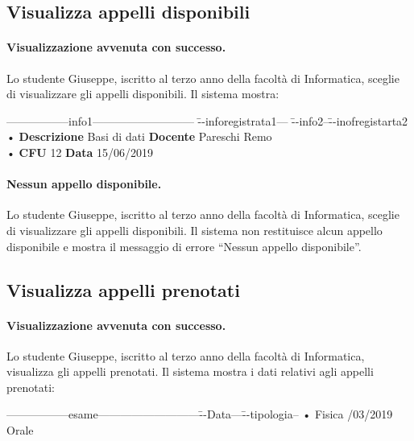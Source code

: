 \subsection{Visualizza appelli disponibili}
\paragraph{Visualizzazione avvenuta con successo.}
Lo studente Giuseppe, iscritto al terzo anno della facoltà di Informatica, sceglie di visualizzare gli appelli disponibili. Il sistema mostra:

 \begin{tabbing}
	\hspace{1cm}-----------------info1--------------------------- \= --inforegistrata1--- \= --info2--\=--inofregistarta2 \kill
	\hspace{1cm} • \textbf{Descrizione} Basi di dati \> \textbf{Docente} Pareschi Remo
	  \\
	\hspace{1cm} •  \textbf{CFU} 12  \> \textbf{Data} 15/06/2019 \\
\end{tabbing}

\paragraph{Nessun appello disponibile.}
Lo studente Giuseppe, iscritto al terzo anno della facoltà di Informatica, sceglie di visualizzare gli appelli disponibili. Il sistema non restituisce alcun appello disponibile e mostra il messaggio di errore “Nessun appello disponibile”.

\subsection{Visualizza appelli prenotati}
\paragraph{Visualizzazione avvenuta con successo.}
Lo studente Giuseppe, iscritto al terzo anno della facoltà di Informatica, visualizza gli appelli prenotati. Il sistema mostra i dati relativi agli appelli prenotati: 

 \begin{tabbing}
	\hspace{1cm}-----------------esame---------------------------\=--Data---\= --tipologia--\kill
	\hspace{1cm} • Fisica /03/2019 \> Orale \\
\end{tabbing}

